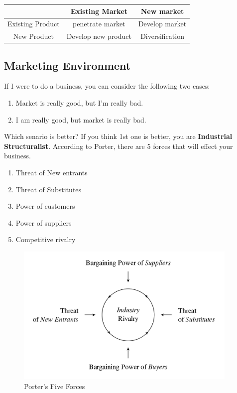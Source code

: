 \documentclass[12pt]{article}
\begin{document}
\begin{tabular}{ |c|c|c| }
	\hline
  	& Existing Market & New market \\ [2ex]
	\hline
	Existing Product & penetrate market & Develop market \\ [2ex]
	\hline
	New Product & Develop new product & Diversification \\ [2ex]
	\hline
\end{tabular}

\subsection{Marketing Environment}
If I were to do a business, you can consider the following two cases:
\begin{enumerate}
	\item Market is really good, but I'm really bad.
	\item I am really good, but market is really bad.
\end{enumerate}

Which senario is better? If you think 1st one is better, you are \textbf{Industrial Structuralist}.
According to Porter, there are 5 forces that will effect your business.
\begin{enumerate}
	\item Threat of New entrants
	\item Threat of Substitutes
	\item Power of customers
	\item Power of suppliers
	\item Competitive rivalry
\end{enumerate}

\begin{figure}[H]
	\centering
	\includegraphics[width=0.95\textwidth]{img/porter5.png}
	\caption{Porter's Five Forces}
	\label{}
\end{figure}
\end{document}
